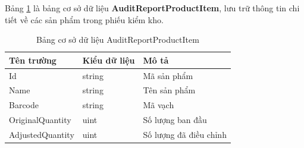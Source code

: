\documentclass[../DoAn.tex]{subfiles}
\begin{document}
Bảng \ref{table:database_auditreportproductitem} là bảng cơ sở dữ liệu \textbf{AuditReportProductItem}, lưu trữ thông tin chi tiết về các sản phẩm trong phiếu kiểm kho.
\begin{table}[H]
    \centering
    \begin{tabularx}{\textwidth}{|p{4cm}|p{3cm}|X|}
        \hline
        \textbf{Tên trường} & \textbf{Kiểu dữ liệu} & \textbf{Mô tả}         \\ \hline
        Id                  & string                & Mã sản phẩm            \\ \hline
        Name                & string                & Tên sản phẩm           \\ \hline
        Barcode             & string                & Mã vạch                \\ \hline
        OriginalQuantity    & uint                  & Số lượng ban đầu       \\ \hline
        AdjustedQuantity    & uint                  & Số lượng đã điều chỉnh \\ \hline
    \end{tabularx}
    \caption{Bảng cơ sở dữ liệu AuditReportProductItem}
    \label{table:database_auditreportproductitem}
\end{table}
\break
\end{document}

